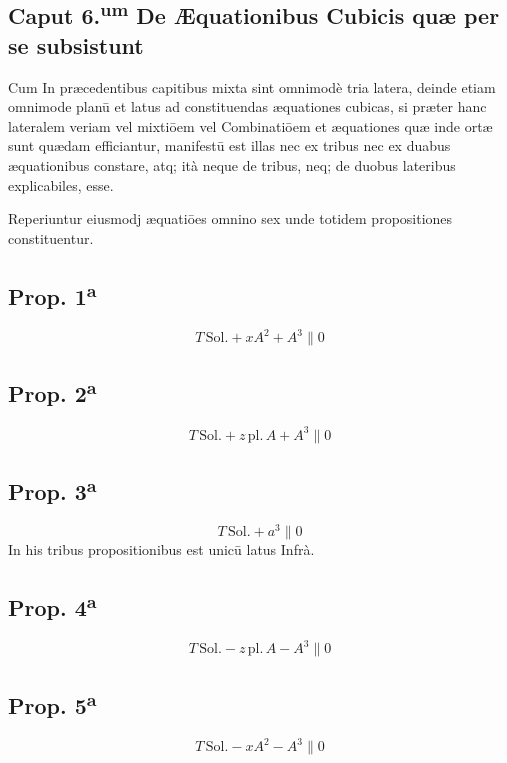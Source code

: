 \documentclass[11pt,a4paper]{article}
\begin{document}

\subsection*{Caput 6.\textsuperscript{um} De Æquationibus Cubicis quæ per se subsistunt}

Cum In præcedentibus capitibus mixta sint omnimodè tria latera, deinde etiam omnimode planū et latus ad constituendas æquationes cubicas, si præter hanc lateralem veriam vel mixtiōem vel Combinatiōem et æquationes quæ inde ortæ sunt quædam efficiantur, manifestū est illas nec ex tribus nec ex duabus æquationibus constare, atq; ità neque de tribus, neq; de duobus lateribus explicabiles, esse.

Reperiuntur eiusmodj æquatiōes omnino sex unde totidem propositiones constituentur.

\subsection*{Prop. 1\textsuperscript{a}}
\[ T\,\mathrm{Sol.} + xA^{2} + A^{3} \parallel 0 \]
\subsection*{Prop. 2\textsuperscript{a}}
\[ T\,\mathrm{Sol.} + z\,\mathrm{pl.}\,A + A^{3} \parallel 0 \]
\subsection*{Prop. 3\textsuperscript{a}}
\[ T\,\mathrm{Sol.} + a^{3} \parallel 0 \]
In his tribus propositionibus est unicū latus Infrà.

\subsection*{Prop. 4\textsuperscript{a}}
\[ T\,\mathrm{Sol.} - z\,\mathrm{pl.}\,A - A^{3} \parallel 0 \]
\subsection*{Prop. 5\textsuperscript{a}}
\[ T\,\mathrm{Sol.} - xA^{2} - A^{3} \parallel 0 \]
\end{document}
